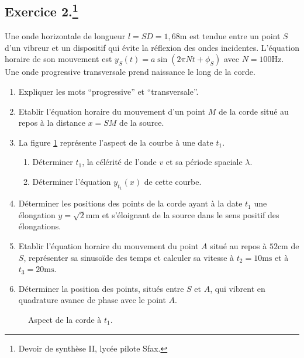 \documentclass[a4paper]{article}
\begin{document}
\subsection*{Exercice 2.\footnote{Devoir de synthèse II, lycée pilote Sfax.}}
Une onde horizontale de longueur $l=SD=1,68\si{\meter}$ est tendue entre un point $S$ d'un vibreur et un dispositif qui évite la réflexion des ondes incidentes. L'équation horaire de son mouvement est $y_S(t)=a\sin(2\pi Nt+\phi_S)$ avec $N=100\si{\hertz}$. Une onde progressive transversale prend naissance le long de la corde.
 \begin{enumerate}
	 \item Expliquer les mots  \enquote{progressive} et \enquote{transversale}.
	 \item Etablir l'équation horaire du mouvement d'un point $M$ de la corde situé au repos à la distance $x=SM$ de la source.
	 \item La figure \ref{fig:exII} représente l'aspect de la courbe à une date $t_1$.
		 \begin{enumerate}
			 \item Déterminer $t_1$, la célérité de l'onde $v$ et sa période spaciale $\lambda$.
			 \item Déterminer l'équation $y_{t_1}(x)$ de cette courbe.
		 \end{enumerate}
	 \item Déterminer les positions des points de la corde ayant à la date $t_1$ une élongation $y=\sqrt{2}\si{\milli\meter}$ et s'éloignant de la source dans le sens positif des élongations.
	 \item Etablir l'équation horaire du mouvement du point $A$ situé au repos à $52\si{\cm}$ de $S$, représenter sa sinusoïde des temps et calculer sa vitesse à $t_2=10\si{\milli\second}$ et à $t_3=20\si{\milli\second}$.
	 \item Déterminer la position des points, situés entre $S$ et $A$, qui vibrent en quadrature avance de phase avec le point $A$.
\end{enumerate}
\begin{figure}[h!]
	\centering
{}
	\caption{Aspect de la corde à $t_1$.}
	\label{fig:exII}
\end{figure}
\end{document}

